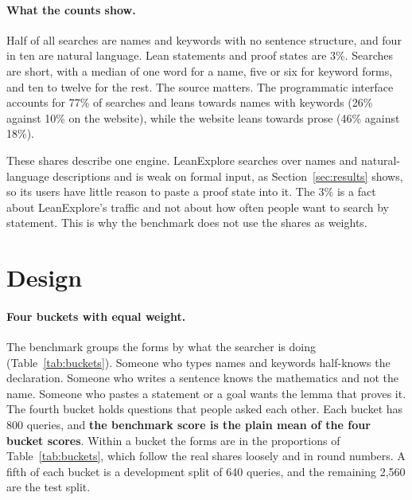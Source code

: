 \documentclass{article}
\begin{document}
\paragraph{What the counts show.} Half of all searches are names and keywords
with no sentence structure, and four in ten are natural language. Lean
statements and proof states are 3\%. Searches are short, with a median of one
word for a name, five or six for keyword forms, and ten to twelve for the
rest. The source matters. The programmatic interface accounts for 77\% of
searches and leans towards names with keywords (26\% against 10\% on the
website), while the website leans towards prose (46\% against 18\%).

These shares describe one engine. LeanExplore searches over names and
natural-language descriptions and is weak on formal input, as
Section~\ref{sec:results} shows, so its users have little reason to paste a
proof state into it. The 3\% is a fact about LeanExplore's traffic and not
about how often people want to search by statement. This is why the benchmark
does not use the shares as weights.

\section{Design}
\label{sec:design}

\paragraph{Four buckets with equal weight.} The benchmark groups the forms
by what the searcher is doing (Table~\ref{tab:buckets}). Someone who types
names and keywords half-knows the declaration. Someone who writes a sentence
knows the mathematics and not the name. Someone who pastes a statement or a
goal wants the lemma that proves it. The fourth bucket holds questions that
people asked each other. Each bucket has 800 queries, and \textbf{the
benchmark score is the plain mean of the four bucket scores}. Within a bucket
the forms are in the proportions of Table~\ref{tab:buckets}, which follow the
real shares loosely and in round numbers. A fifth of each bucket is a
development split of 640 queries, and the remaining 2,560 are the test split.
\end{document}

